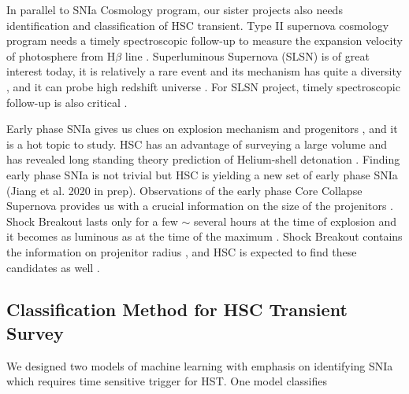 \documentclass[useamsfonts]{pasj01}
\begin{document}
In parallel to SNIa Cosmology program, our sister projects also needs identification and classification of HSC transient.   
Type II supernova cosmology program needs a timely spectroscopic follow-up to measure the expansion velocity of photosphere from H$\beta$ line \citep{dejaeger17a}.
Superluminous Supernova (SLSN) is of great interest today, it is relatively a rare event\citep{quimby11a} and its mechanism has quite a diversity \citep{galyam12a,moriya12a}, and it can probe high redshift universe \citep{cooke12a}.    
For SLSN project, timely spectroscopic follow-up is also critical \citep{moriya19a,curtin19a}.

Early phase SNIa gives us clues on explosion mechanism \citep{maeda18a} and progenitors \citep{cao15a}, and it is a hot topic to study.
HSC has an advantage of surveying a large volume and has revealed long standing theory prediction of Helium-shell detonation \citep{jiang18a}.
Finding early phase SNIa is not trivial but HSC is yielding a new set of early phase SNIa (Jiang et al. 2020 in prep).
Observations of the early phase Core Collapse Supernova provides us with a crucial information on the size of the projenitors \citep{thompson03a,chevalier11a}.  Shock Breakout lasts only for a few $\sim$ several hours at the time of explosion and it becomes as luminous as at the time of the maximum \citep{gezari08a}. 
Shock Breakout contains the information on projenitor radius \citep{nakar10a}, and HSC is expected to find these candidates as well \citep{tominaga11a}.



\subsection{Classification Method for HSC Transient Survey}
We designed two models of machine learning with emphasis on identifying SNIa which requires time sensitive trigger for HST.
One model classifies 
%
%
%
%
%
%
\end{document}
